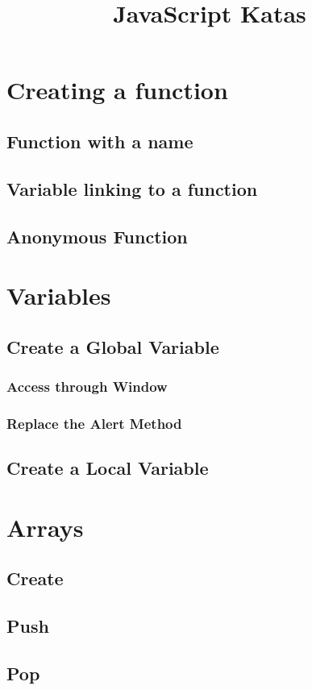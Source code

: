 \documentclass {amsart}
\title{JavaScript Katas}
\begin{document}
\maketitle

\section{Creating a function}
	\subsection{Function with a name}
	\subsection{Variable linking to a function}
	\subsection{Anonymous Function}

\section{Variables}
	\subsection{Create a Global Variable}
		\subsubsection{Access through Window}
			\subsubsection{Replace the Alert Method}
	\subsection{Create a Local Variable}


\section{Arrays}
	\subsection{Create}
	\subsection{Push}
	\subsection{Pop}
\end{document}
